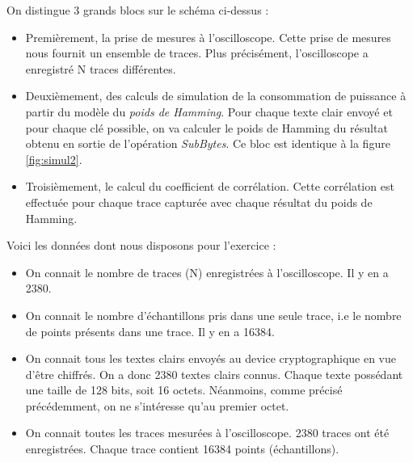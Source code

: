 \documentclass[oneside]{book}
\begin{document}
\hspace{-0.5 cm}On distingue 3 grands blocs sur le schéma ci-dessus :
\begin{itemize}
\item Premièrement, la prise de mesures à l'oscilloscope. Cette prise de mesures nous fournit un ensemble de traces. Plus précisément, l'oscilloscope a enregistré N traces différentes.
\item Deuxièmement, des calculs de simulation de la consommation de puissance à partir du modèle du \textit{poids de Hamming}. Pour chaque texte clair envoyé et pour chaque clé possible, on va calculer le poids de Hamming du résultat obtenu en sortie de l'opération \textit{SubBytes}. Ce bloc est identique à la figure \ref{fig:simul2}.
\item Troisièmement, le calcul du coefficient de corrélation. Cette corrélation est effectuée pour chaque trace capturée avec chaque résultat du poids de Hamming. \\
\end{itemize}

\hspace{-0.5 cm}Voici les données dont nous disposons pour l'exercice :
\begin{itemize}
\item On connait le nombre de traces (N) enregistrées à l'oscilloscope. Il y en a 2380.
\item On connait le nombre d'échantillons pris dans une seule trace, i.e le nombre de points présents dans une trace. Il y en a 16384.
\item On connait tous les textes clairs envoyés au device cryptographique en vue d'être chiffrés. On a donc 2380 textes clairs connus. Chaque texte possédant une taille de 128 bits, soit 16 octets. Néanmoins, comme précisé précédemment, on ne s'intéresse qu'au premier octet.
\item On connait toutes les traces mesurées à l'oscilloscope. 2380 traces ont été enregistrées. Chaque trace contient 16384 points (échantillons). \\
\end{itemize}
\end{document}
